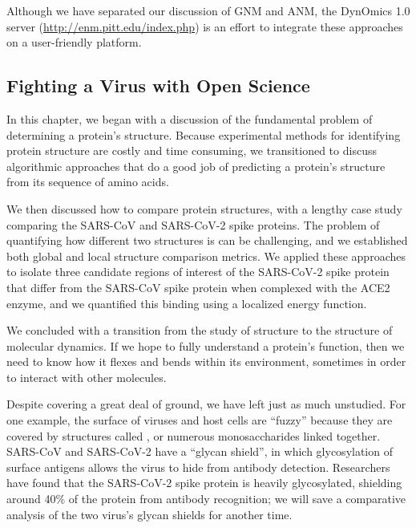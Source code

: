 Although we have separated our discussion of GNM and ANM, the DynOmics 1.0 server (\url{http://enm.pitt.edu/index.php}) is an effort to integrate these approaches on a user-friendly platform. 

\FloatBarrier
{}
\subsection{Fighting a Virus with Open Science}

In this chapter, we began with a discussion of the fundamental problem of determining a protein's structure. Because experimental methods for identifying protein structure are costly and time consuming, we transitioned to discuss algorithmic approaches that do a good job of predicting a protein's structure from its sequence of amino acids.

We then discussed how to compare protein structures, with a lengthy case study comparing the SARS-CoV and SARS-CoV-2 spike proteins. The problem of quantifying how different two structures is can be challenging, and we established both global and local structure comparison metrics. We applied these approaches to isolate three candidate regions of interest of the SARS-CoV-2 spike protein that differ from the SARS-CoV spike protein when complexed with the ACE2 enzyme, and we quantified this binding using a localized energy function.

We concluded with a transition from the study of structure to the structure of molecular dynamics. If we hope to fully understand a protein's function, then we need to know how it flexes and bends within its environment, sometimes in order to interact with other molecules.

Despite covering a great deal of ground, we have left just as much unstudied. For one example, the surface of viruses and host cells are ``fuzzy'' because they are covered by structures called , or numerous monosaccharides linked together. SARS-CoV and SARS-CoV-2 have a “glycan shield”, in which glycosylation of surface antigens allows the virus to hide from antibody detection. Researchers have found that the SARS-CoV-2 spike protein is heavily glycosylated, shielding around 40\% of the protein from antibody recognition; we will save a comparative analysis of the two virus's glycan shields for another time.

